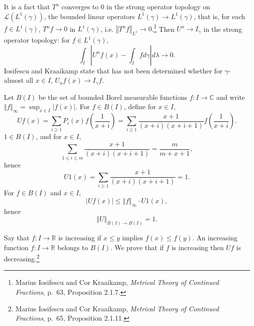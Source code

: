 \documentclass{article}
\newcommand{\norm}[1]{\left\Vert #1 \right\Vert}
\theoremstyle{definition}
\theoremstyle{definition}
\begin{document}
It is a fact that $T^n$ converges to $0$ in the strong operator topology on $\mathscr{L}(L^1(\gamma))$, the bounded linear operators
$L^1(\gamma) \to L^1(\gamma)$, that is,
for each $f \in L^1(\gamma)$, $T^n f \to 0$ in $L^1(\gamma)$, i.e.
$\norm{T^n f}_{L^1} \to 0$.\footnote{Marius Iosifescu and Cor Kraaikamp,
{\em Metrical Theory of Continued Fractions}, p.~63, Proposition 2.1.7.}
Then $U^n \to I_\gamma$ in the strong operator topology: for $f \in L^1(\gamma)$,
\[
\int_I \left| U^n f(x) - \int_I f d\gamma \right| d\lambda \to 0.
\]
Iosifescu and Kraaikamp state that has not been determined whether for $\gamma$-almost all $x \in I$,
$U_n f (x) \to I_\gamma f$. 


Let $B(I)$ be the set of bounded Borel measurable functions $f:I \to \mathbb{C}$ and write $\norm{f}_\infty = \sup_{x \in I} |f(x)|$.
For $f \in B(I)$, define for $x \in I$,
\[
U f(x) = \sum_{i \geq 1} P_i(x) f\left(\frac{1}{x+i}\right)
= \sum_{i \geq 1} \frac{x+1}{(x+i)(x+i+1)} f\left(\frac{1}{x+i}\right).
\]
$1 \in B(I)$, and
for $x \in I$,
\[
\sum_{1 \leq i \leq m}  \frac{x+1}{(x+i)(x+i+1)} = \frac{m}{m+x+1},
\]
hence
\[
U1(x) = \sum_{i \geq 1}  \frac{x+1}{(x+i)(x+i+1)} = 1.
\]
For $f \in B(I)$ and $x \in I$,
\[
|Uf(x)| \leq \norm{f}_\infty \cdot U1(x),
\]
hence
\[
\norm{U}_{B(I) \to B(I)} = 1.
\]

Say that $f:I \to \mathbb{R}$ is increasing if $x \leq y$ implies $f(x) \leq f(y)$. 
An increasing function $f:I \to \mathbb{R}$ belongs to $B(I)$. We prove that 
if $f$ is increasing then $Uf$ is decreasing.\footnote{Marius Iosifescu and Cor Kraaikamp,
{\em Metrical Theory of Continued Fractions}, p.~65, Proposition 2.1.11.}
\end{document}

